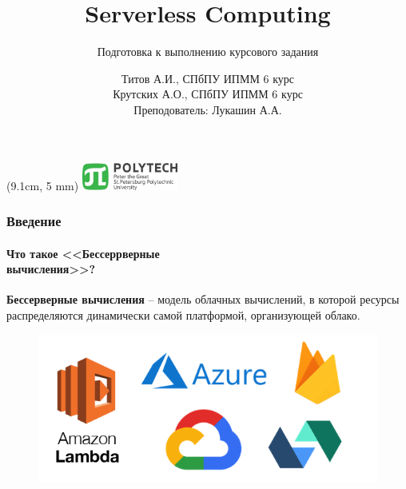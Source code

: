 \documentclass{beamer}
\title{\textbf{Serverless Computing}}
\subtitle{Подготовка к выполнению курсового задания}
\author[Author]{
    Титов А.И., СПбПУ ИПММ 6 курс
    \\
    Крутских А.О., СПбПУ ИПММ 6 курс
    \\
    Преподователь: Лукашин А.А.}
\date{}
\begin{document}
    {
    \begin{textblock*}{100mm}(9.1cm, 5 mm)
        \includegraphics[height=9mm]{images/POLYTECH}
    \end{textblock*}
    }

    \begingroup
    \renewcommand{\insertframenumber}{}
    \begin{frame}
        \vspace*{1.5cm}
        \addtocounter{framenumber}{-1}
        \titlepage
    \end{frame}
    \endgroup


    \begin{frame}
        \frametitle{Введение}
        \framesubtitle{Что такое <<Бессеррверные\\вычисления>>?}
        \textbf{Бессерверные вычисления} -- модель облачных вычислений, в которой ресурсы распределяются динамически самой платформой, организующей облако.
        \begin{figure}
            \includegraphics[width=0.7\linewidth]{images/Logos}
        \end{figure}
    \end{frame}
\end{document}

